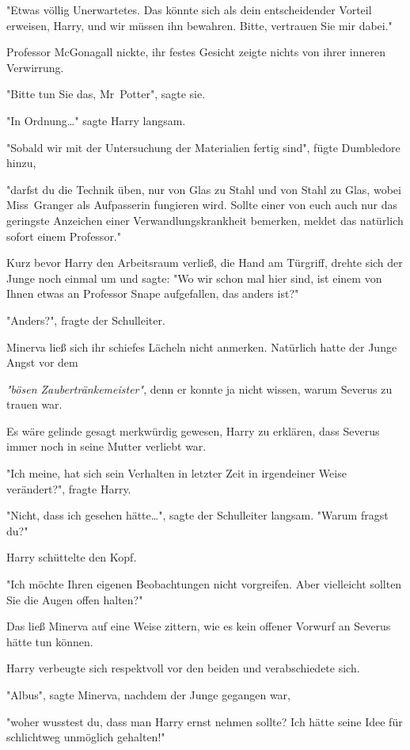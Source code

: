 {"Etwas völlig Unerwartetes. Das könnte sich als dein entscheidender Vorteil erweisen, Harry, und wir müssen ihn bewahren. Bitte, vertrauen Sie mir dabei."

Professor McGonagall nickte, ihr festes Gesicht zeigte nichts von ihrer inneren Verwirrung.

"Bitte tun Sie das, Mr~Potter", sagte sie.

"In Ordnung…" sagte Harry langsam.

"Sobald wir mit der Untersuchung der Materialien fertig sind", fügte Dumbledore hinzu,

"darfst du die Technik üben, nur von Glas zu Stahl und von Stahl zu Glas, wobei Miss~Granger als Aufpasserin fungieren wird. Sollte einer von euch auch nur das geringste Anzeichen einer Verwandlungskrankheit bemerken, meldet das natürlich sofort einem Professor."

Kurz bevor Harry den Arbeitsraum verließ, die Hand am Türgriff, drehte sich der Junge noch einmal um und sagte: "Wo wir schon mal hier sind, ist einem von Ihnen etwas an Professor Snape aufgefallen, das anders ist?"

"Anders?", fragte der Schulleiter.

Minerva ließ sich ihr schiefes Lächeln nicht anmerken. Natürlich hatte der Junge Angst vor dem

\emph{"bösen Zaubertränkemeister"}, denn er konnte ja nicht wissen, warum Severus zu trauen war.

Es wäre gelinde gesagt merkwürdig gewesen, Harry zu erklären, dass Severus immer noch in seine Mutter verliebt war.

"Ich meine, hat sich sein Verhalten in letzter Zeit in irgendeiner Weise verändert?", fragte Harry.

"Nicht, dass ich gesehen hätte…", sagte der Schulleiter langsam. "Warum fragst du?"

Harry schüttelte den Kopf.

"Ich möchte Ihren eigenen Beobachtungen nicht vorgreifen. Aber vielleicht sollten Sie die Augen offen halten?"

Das ließ Minerva auf eine Weise zittern, wie es kein offener Vorwurf an Severus hätte tun können.

Harry verbeugte sich respektvoll vor den beiden und verabschiedete sich.

"Albus", sagte Minerva, nachdem der Junge gegangen war,

"woher wusstest du, dass man Harry ernst nehmen sollte? Ich hätte seine Idee für schlichtweg unmöglich gehalten!"

}
